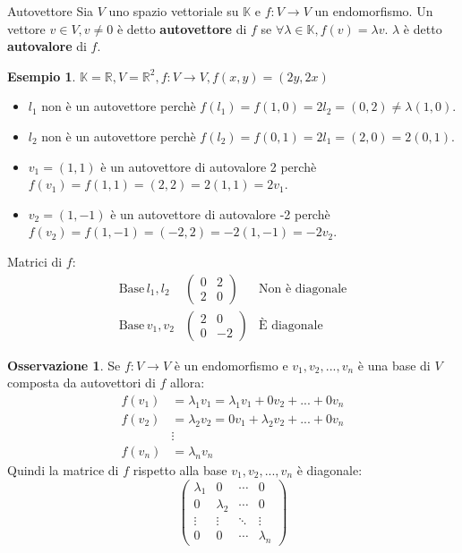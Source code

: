 \documentclass[a4paper]{article}
\theoremstyle{definition}
\newtheorem*{oss}{Osservazione}
\newtheorem*{es}{Esempio}
\begin{document}
	\begin{deff}{Autovettore}{}
		Sia $V$ uno spazio vettoriale su $\mathbb{K}$ e $f: V \to V$ un endomorfismo.
		Un vettore $v \in V, v \ne 0$ è detto \textbf{autovettore} di $f$ se $\forall \lambda \in \mathbb{K}, f(v) = \lambda v$.
		$\lambda$ è detto \textbf{autovalore} di $f$.
	\end{deff}
	\begin{es}
		$\mathbb{K} = \mathbb{R}, V = \mathbb{R}^2, f: V \to V, f(x, y) = (2y, 2x)$
		\begin{itemize}
			\item $l_1$ non è un autovettore perchè $f(l_1) = f(1, 0) = 2l_2 = (0, 2) \ne \lambda (1, 0)$.
			\item $l_2$ non è un autovettore perchè $f(l_2) = f(0, 1) = 2l_1 = (2, 0) = 2(0, 1)$.
			\item $v_1 = (1, 1)$ è un autovettore di autovalore 2 perchè $f(v_1) = f(1, 1) = (2, 2) = 2(1, 1) = 2v_1$.
			\item $v_2 = (1, -1)$ è un autovettore di autovalore -2 perchè $f(v_2) = f(1, -1) = (-2, 2) = -2(1, -1) = -2v_2$.
		\end{itemize}
		Matrici di $f$:
		\begin{align*}
			\text{Base}\, l_1, l_2 & \begin{pmatrix}
				0 & 2 \\
				2 & 0
			\end{pmatrix} & \text{Non è diagonale} \\
			\text{Base}\, v_1, v_2 & \begin{pmatrix}
				2 & 0 \\
				0 & -2
			\end{pmatrix} & \text{È diagonale}
		\end{align*}
	\end{es}
	\begin{oss}
		Se $f: V \to V$ è un endomorfismo e $v_1, v_2, ..., v_n$ è una base di $V$ composta da autovettori di $f$ allora:
		\begin{align*}
			f(v_1) &= \lambda_1 v_1 = \lambda_1 v_1 + 0v_2 + ... + 0v_n \\
			f(v_2) &= \lambda_2 v_2 = 0v_1 + \lambda_2 v_2 + ... + 0v_n \\
			&\vdots \\
			f(v_n) &= \lambda_n v_n
		\end{align*}
		Quindi la matrice di $f$ rispetto alla base $v_1, v_2, ..., v_n$ è diagonale:
		\begin{equation*}
			\begin{pmatrix}
				\lambda_1 & 0 & \cdots & 0 \\
				0 & \lambda_2 & \cdots & 0 \\
				\vdots & \vdots & \ddots & \vdots \\
				0 & 0 & \cdots & \lambda_n
			\end{pmatrix}
		\end{equation*}
	\end{oss}
\end{document}
